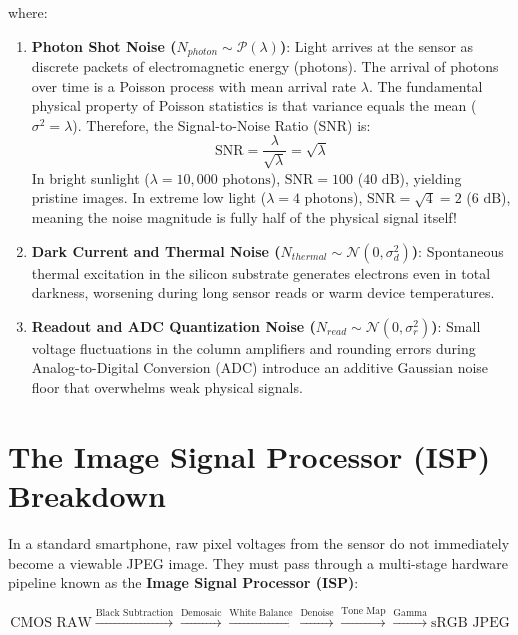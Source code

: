 where:
\begin{enumerate}
    \item \textbf{Photon Shot Noise ($N_{photon} \sim \mathcal{P}(\lambda)$)}: Light arrives at the sensor as discrete packets of electromagnetic energy (photons). The arrival of photons over time is a Poisson process with mean arrival rate $\lambda$. The fundamental physical property of Poisson statistics is that variance equals the mean ($\sigma^2 = \lambda$). Therefore, the Signal-to-Noise Ratio (SNR) is:
    \begin{equation}
    \text{SNR} = \frac{\lambda}{\sqrt{\lambda}} = \sqrt{\lambda}
    \label{eq:snr_derivation}
    \end{equation}
    In bright sunlight ($\lambda = 10,000\text{ photons}$), $\text{SNR} = 100$ ($40\text{ dB}$), yielding pristine images. In extreme low light ($\lambda = 4\text{ photons}$), $\text{SNR} = \sqrt{4} = 2$ ($6\text{ dB}$), meaning the noise magnitude is fully half of the physical signal itself!
    \item \textbf{Dark Current and Thermal Noise ($N_{thermal} \sim \mathcal{N}(0, \sigma_d^2)$)}: Spontaneous thermal excitation in the silicon substrate generates electrons even in total darkness, worsening during long sensor reads or warm device temperatures.
    \item \textbf{Readout and ADC Quantization Noise ($N_{read} \sim \mathcal{N}(0, \sigma_r^2)$)}: Small voltage fluctuations in the column amplifiers and rounding errors during Analog-to-Digital Conversion (ADC) introduce an additive Gaussian noise floor that overwhelms weak physical signals.
\end{enumerate}

\section{The Image Signal Processor (ISP) Breakdown}
In a standard smartphone, raw pixel voltages from the sensor do not immediately become a viewable JPEG image. They must pass through a multi-stage hardware pipeline known as the \textbf{Image Signal Processor (ISP)}:

\begin{equation*}
\text{CMOS RAW} \xrightarrow{\text{Black Subtraction}} \xrightarrow{\text{Demosaic}} \xrightarrow{\text{White Balance}} \xrightarrow{\text{Denoise}} \xrightarrow{\text{Tone Map}} \xrightarrow{\text{Gamma}} \text{sRGB JPEG}
\end{equation*}

